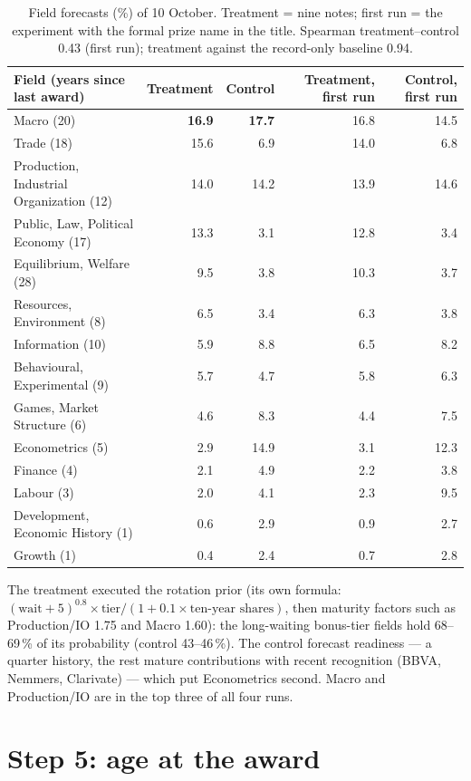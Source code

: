 \documentclass[11pt,a4paper]{article}
\begin{document}
\begin{table}[htbp]
\small
\centering
\begin{tabular}{@{}lrrrr@{}}
\toprule
Field (years since last award) & Treatment & Control & Treatment, first run & Control, first run \\
\midrule
Macro (20) & \textbf{16.9} & \textbf{17.7} & 16.8 & 14.5 \\
Trade (18) & 15.6 & 6.9 & 14.0 & 6.8 \\
Production, Industrial Organization (12) & 14.0 & 14.2 & 13.9 & 14.6 \\
Public, Law, Political Economy (17) & 13.3 & 3.1 & 12.8 & 3.4 \\
Equilibrium, Welfare (28) & 9.5 & 3.8 & 10.3 & 3.7 \\
Resources, Environment (8) & 6.5 & 3.4 & 6.3 & 3.8 \\
Information (10) & 5.9 & 8.8 & 6.5 & 8.2 \\
Behavioural, Experimental (9) & 5.7 & 4.7 & 5.8 & 6.3 \\
Games, Market Structure (6) & 4.6 & 8.3 & 4.4 & 7.5 \\
Econometrics (5) & 2.9 & 14.9 & 3.1 & 12.3 \\
Finance (4) & 2.1 & 4.9 & 2.2 & 3.8 \\
Labour (3) & 2.0 & 4.1 & 2.3 & 9.5 \\
Development, Economic History (1) & 0.6 & 2.9 & 0.9 & 2.7 \\
Growth (1) & 0.4 & 2.4 & 0.7 & 2.8 \\
\bottomrule
\end{tabular}
\caption{Field forecasts (\%) of 10 October. Treatment = nine notes; first run = the experiment with the formal prize
name in the title. Spearman treatment--control 0.43 (first run); treatment against the record-only baseline 0.94.}
\label{tab:econ-fields}
\end{table}

\noindent The treatment executed the rotation prior (its own formula: $(\text{wait}+5)^{0.8}\times\text{tier}/(1+0.1
\times\text{ten-year shares})$, then maturity factors such as Production/IO 1.75 and Macro 1.60): the long-waiting
bonus-tier fields hold 68--69\,\% of its probability (control 43--46\,\%). The control forecast readiness --- a quarter
history, the rest mature contributions with recent recognition (BBVA, Nemmers, Clarivate) --- which put Econometrics
second. Macro and Production/IO are in the top three of all four runs.

\section{Step 5: age at the award}
\end{document}
